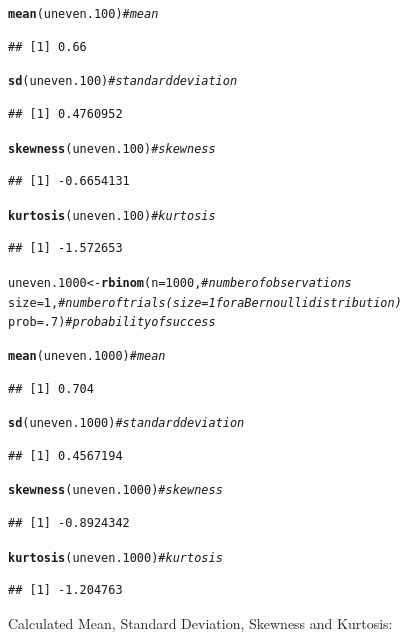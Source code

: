 \documentclass{article}\usepackage[]{graphicx}\usepackage[]{color}
\makeatletter
\newcommand{\hlnum}[1]{\textcolor[rgb]{0.686,0.059,0.569}{#1}}%
\newcommand{\hlcom}[1]{\textcolor[rgb]{0.678,0.584,0.686}{\textit{#1}}}%
\newcommand{\hlstd}[1]{\textcolor[rgb]{0.345,0.345,0.345}{#1}}%
\newcommand{\hlkwb}[1]{\textcolor[rgb]{0.69,0.353,0.396}{#1}}%
\newcommand{\hlkwc}[1]{\textcolor[rgb]{0.333,0.667,0.333}{#1}}%
\newcommand{\hlkwd}[1]{\textcolor[rgb]{0.737,0.353,0.396}{\textbf{#1}}}%
\newenvironment{kframe}{%
 \def\at@end@of@kframe{}%
 \ifinner\ifhmode%
  \def\at@end@of@kframe{\end{minipage}}%
  \begin{minipage}{\columnwidth}%
 \fi\fi%
 \def\FrameCommand##1{\hskip\@totalleftmargin \hskip-\fboxsep
 \colorbox{shadecolor}{##1}\hskip-\fboxsep
     \hskip-\linewidth \hskip-\@totalleftmargin \hskip\columnwidth}%
 \MakeFramed {\advance\hsize-\width
   \@totalleftmargin\z@ \linewidth\hsize
   \@setminipage}}%
 {\par\unskip\endMakeFramed%
 \at@end@of@kframe}
\newenvironment{knitrout}{}{} %
\makeatother
\begin{document}
\begin{enumerate}
\begin{enumerate}
\begin{knitrout}
\begin{kframe}
\begin{alltt}
\hlkwd{mean}\hlstd{(uneven.100)}                 \hlcom{#mean}
\end{alltt}
\begin{verbatim}
## [1] 0.66
\end{verbatim}
\begin{alltt}
\hlkwd{sd}\hlstd{(uneven.100)}                   \hlcom{#standard deviation}
\end{alltt}
\begin{verbatim}
## [1] 0.4760952
\end{verbatim}
\begin{alltt}
\hlkwd{skewness}\hlstd{(uneven.100)}             \hlcom{#skewness}
\end{alltt}
\begin{verbatim}
## [1] -0.6654131
\end{verbatim}
\begin{alltt}
\hlkwd{kurtosis}\hlstd{(uneven.100)}             \hlcom{#kurtosis}
\end{alltt}
\begin{verbatim}
## [1] -1.572653
\end{verbatim}
\begin{alltt}
\hlstd{uneven.1000} \hlkwb{<-} \hlkwd{rbinom}\hlstd{(}\hlkwc{n}\hlstd{=}\hlnum{1000}\hlstd{,}    \hlcom{#number of observations}
                    \hlkwc{size}\hlstd{=}\hlnum{1}\hlstd{,}      \hlcom{#number of trials (size=1 for a Bernoulli distribution)}
                    \hlkwc{prob}\hlstd{=}\hlnum{.7}\hlstd{)}     \hlcom{#probability of success}

\hlkwd{mean}\hlstd{(uneven.1000)}                \hlcom{#mean}
\end{alltt}
\begin{verbatim}
## [1] 0.704
\end{verbatim}
\begin{alltt}
\hlkwd{sd}\hlstd{(uneven.1000)}                  \hlcom{#standard deviation}
\end{alltt}
\begin{verbatim}
## [1] 0.4567194
\end{verbatim}
\begin{alltt}
\hlkwd{skewness}\hlstd{(uneven.1000)}            \hlcom{#skewness}
\end{alltt}
\begin{verbatim}
## [1] -0.8924342
\end{verbatim}
\begin{alltt}
\hlkwd{kurtosis}\hlstd{(uneven.1000)}            \hlcom{#kurtosis}
\end{alltt}
\begin{verbatim}
## [1] -1.204763
\end{verbatim}
\end{kframe}
\end{knitrout}
Calculated Mean, Standard Deviation, Skewness and Kurtosis:


\end{enumerate}
\end{enumerate}
\end{document}
